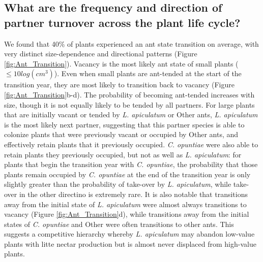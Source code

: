 \documentclass[11pt]{article}
\begin{document}
\subsection*{What are the frequency and direction of partner turnover across the plant life cycle?}
We found that 40\% of plants experienced an ant state transition on average, with very distinct size-dependence and directional patterns (Figure \ref{fig:Ant_Transition}). 
Vacancy is the most likely ant state of small plants ($\leq 10 log(cm^3)$).
Even when small plants are ant-tended at the start of the transition year, they are most likely to transition back to vacancy (Figure \ref{fig:Ant_Transition}b-d). 
The probability of becoming ant-tended increases with size, though it is not equally likely to be tended by all partners. 
For large plants that are initially vacant or tended by \textit{L. apiculatum} or Other ants, \textit{L. apiculatum} is the most likely next partner, suggesting that this partner species is able to colonize plants that were previously vacant or occupied by Other ants, and effectively retain plants that it previously occupied.  
\textit{C. opuntiae} were also able to retain plants they previously occupied, but not as well as \textit{L. apiculatum}: for plants that begin the transition year with \textit{C. opuntiae}, the probability that those plants remain occupied by \textit{C. opuntiae} at the end of the transition year is only slightly greater than the probability of take-over by \textit{L. apiculatum}, while take-over in the other directino is extremely rare. 
It is also notable that transitions away from the initial state of  \textit{L. apiculatum} were almost always transitions to vacancy (Figure \ref{fig:Ant_Transition}d), while transitions away from the initial states of \textit{C. opuntiae} and Other  were often transitions to other ants. 
This suggests a competitive hierarchy whereby \textit{L. apiculatum} may abandon low-value plants with litte nectar production but is almost never displaced from high-value plants. 
\end{document}
